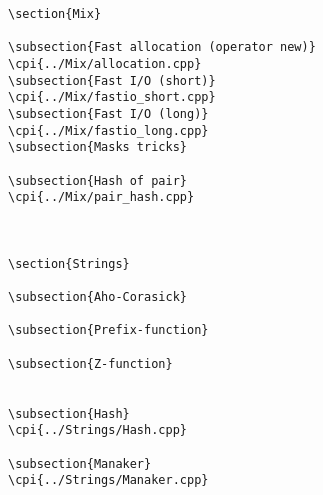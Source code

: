 {\begin{verbatim}
\section{Mix}

\subsection{Fast allocation (operator new)}
\cpi{../Mix/allocation.cpp}
\subsection{Fast I/O (short)}
\cpi{../Mix/fastio_short.cpp}
\subsection{Fast I/O (long)}
\cpi{../Mix/fastio_long.cpp}
\subsection{Masks tricks}

\subsection{Hash of pair}
\cpi{../Mix/pair_hash.cpp}



\section{Strings}

\subsection{Aho-Corasick}

\subsection{Prefix-function}

\subsection{Z-function}


\subsection{Hash}
\cpi{../Strings/Hash.cpp}

\subsection{Manaker}
\cpi{../Strings/Manaker.cpp}

\end{verbatim}}
